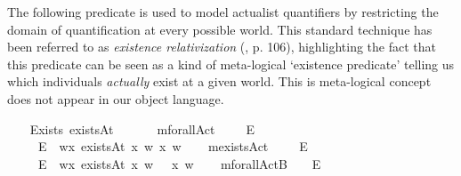 \begin{isabellebody}
\isamarkuptrue%
%
\begin{isamarkuptext}%
The following predicate is used to model actualist quantifiers by restricting the domain of quantification at every possible world.
This standard technique has been referred to as \emph{existence relativization} (\cite{fitting98}, p. 106),
highlighting the fact that this predicate can be seen as a kind of meta-logical `existence predicate' telling us
which individuals \emph{actually} exist at a given world. This is meta-logical
concept does not appear in our object language.%
\end{isamarkuptext}\isamarkuptrue%
\ \ \isamarkupfalse%
\ Exists{\isacharcolon}{\isacharcolon}{\isachardoublequoteopen}{\isasymup}{\isasymlangle}{\isasymzero}{\isasymrangle}{\isachardoublequoteclose}\ {\isacharparenleft}{\isachardoublequoteopen}existsAt{\isachardoublequoteclose}{\isacharparenright}\isanewline
\ \ \isanewline
\isanewline
\ \ \isamarkupfalse%
\ mforallAct\ \ \ {\isacharcolon}{\isacharcolon}\ {\isachardoublequoteopen}{\isasymup}{\isasymlangle}{\isasymup}{\isasymlangle}{\isasymzero}{\isasymrangle}{\isasymrangle}{\isachardoublequoteclose}\ {\isacharparenleft}{\isachardoublequoteopen}\isactrlbold {\isasymforall}\isactrlsup E{\isachardoublequoteclose}{\isacharparenright}\ \ \ \ \ \ \isanewline
\ \ \ \ \ {\isachardoublequoteopen}\isactrlbold {\isasymforall}\isactrlsup E{\isasymPhi}\ {\isasymequiv}\ {\isasymlambda}w{\isachardot}{\isasymforall}x{\isachardot}\ {\isacharparenleft}existsAt\ x\ w{\isacharparenright}{\isasymlongrightarrow}{\isacharparenleft}{\isasymPhi}\ x\ w{\isacharparenright}{\isachardoublequoteclose}\isanewline
\ \ \isamarkupfalse%
\ mexistsAct\ \ \ {\isacharcolon}{\isacharcolon}\ {\isachardoublequoteopen}{\isasymup}{\isasymlangle}{\isasymup}{\isasymlangle}{\isasymzero}{\isasymrangle}{\isasymrangle}{\isachardoublequoteclose}\ {\isacharparenleft}{\isachardoublequoteopen}\isactrlbold {\isasymexists}\isactrlsup E{\isachardoublequoteclose}{\isacharparenright}\ \isanewline
\ \ \ \ \ {\isachardoublequoteopen}\isactrlbold {\isasymexists}\isactrlsup E{\isasymPhi}\ {\isasymequiv}\ {\isasymlambda}w{\isachardot}{\isasymexists}x{\isachardot}\ {\isacharparenleft}existsAt\ x\ w{\isacharparenright}\ {\isasymand}\ {\isacharparenleft}{\isasymPhi}\ x\ w{\isacharparenright}{\isachardoublequoteclose}\isanewline
\isanewline
\ \ \isamarkupfalse%
\ mforallActB\ \ {\isacharcolon}{\isacharcolon}\ {\isachardoublequoteopen}{\isasymup}{\isasymlangle}{\isasymup}{\isasymlangle}{\isasymzero}{\isasymrangle}{\isasymrangle}{\isachardoublequoteclose}\ {\isacharparenleft}\isactrlbold {\isasymforall}\isactrlsup E{\isachardoublequoteclose}{\isacharbrackleft}{}{\isacharbrackright}{}{\isacharparenright}\ %

\end{isabellebody}
